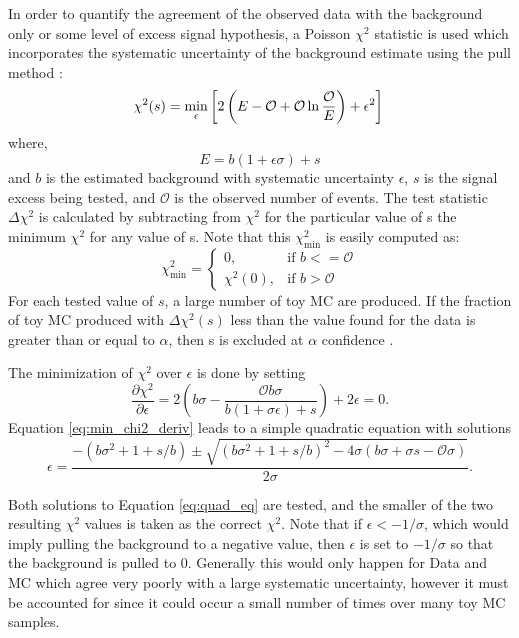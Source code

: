 In order to quantify the agreement of the observed data with the background only or some level of excess signal hypothesis, a Poisson $\chi^2$ statistic is used which incorporates the systematic uncertainty of the background estimate using the pull method \cite{Fogli:2002do,Olive:2016xmw}:
\begin{equation}
\chi^2(s)=\min \limits_\epsilon\left[ 2  \left(  E -\mathcal{O}  + \mathcal{O} \ln \frac{ \mathcal{O} }{ E } \right)
             + \epsilon^2\right] \\
\label{eq:chi2}
\end{equation}
where,
\begin{equation}
E=b(1+\epsilon\sigma)+s
\end{equation} 
and $b$ is the estimated background with systematic uncertainty $\epsilon$, $s$ is the signal excess being tested, and $\mathcal{O}$ is the observed number of events.  The test statistic $\Delta \chi^2$ is calculated by subtracting from $\chi^2$ for the particular value of s the minimum $\chi^2$ for any value of s.  Note that this $\chi^2_\textrm{min}$ is easily computed as:
\begin{equation}
\chi^2_\textrm{min}=
\begin{cases}
0, & \textrm{if } b<=\mathcal{O} \\
\chi^2(0),& \textrm{if } b>\mathcal{O}
\end{cases}
\label{eq:x2_min}
\end{equation}
For each tested value of $s$, a large number of toy MC are produced.  If the fraction of toy MC produced with $\Delta \chi^2(s)$ less than the value found for the data is greater than or equal to $\alpha$, then s is excluded at $\alpha$ confidence \cite{Feldman:1998bu}.  

The minimization of $\chi^2$  over $\epsilon$ is done by setting
\begin{equation}    
\frac{\partial \chi^2}{\partial \epsilon}=2(b\sigma -\frac{\mathcal{O}b\sigma}{b(1+\sigma \epsilon)+s}) + 2\epsilon=0.
\label{eq:min_chi2_deriv}	
\end{equation}
Equation \ref{eq:min_chi2_deriv} leads to a simple quadratic equation with solutions
\begin{equation}
\epsilon=\frac{-(b\sigma^2+1+s/b) \pm \sqrt{(b\sigma^2+1+s/b)^2-4\sigma(b\sigma+\sigma s-\mathcal{O}\sigma)}}{2\sigma}.
\label{eq:quad_eq}
\end{equation}

Both solutions to Equation \ref{eq:quad_eq} are tested, and the smaller of the two resulting $\chi^2$ values is taken as the correct $\chi^2$.  Note that if $\epsilon<-1/\sigma$, which would imply pulling the background to a negative value, then $\epsilon$ is set to $-1/\sigma$ so that the background is pulled to 0.  Generally this would only happen for Data and MC which agree very poorly with a large systematic uncertainty, however it must be accounted for since it could occur a small number of times over many toy MC samples.

